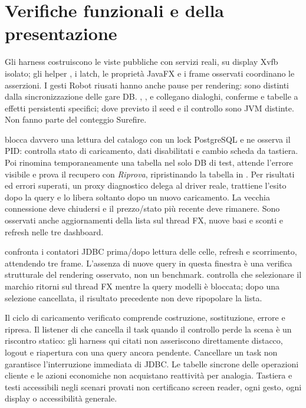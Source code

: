 \section{Verifiche funzionali e della presentazione}\label{sec:test-ui}
Gli harness costruiscono le viste pubbliche con servizi reali, su display
Xvfb isolato; gli helper , i latch, le proprietà JavaFX e i frame
osservati coordinano le asserzioni. I gesti Robot riusati hanno anche
pause per rendering: sono distinti dalla sincronizzazione delle gare DB.
, ,
 e  collegano dialoghi,
conferme e tabelle a effetti persistenti specifici; dove previsto il seed
e il controllo sono JVM distinte. Non fanno parte del conteggio Surefire.

 blocca davvero una lettura del catalogo
con un lock PostgreSQL e ne osserva il PID: controlla stato di caricamento,
dati disabilitati e cambio scheda da tastiera. Poi rinomina temporaneamente
una tabella nel solo DB di test, attende l'errore visibile e prova il
recupero con \emph{Riprova}, ripristinando la tabella in .
Per risultati ed errori superati, un proxy diagnostico delega al driver
reale, trattiene l'esito dopo la query e lo libera soltanto dopo un nuovo
caricamento. La vecchia connessione deve chiudersi e il prezzo/stato più
recente deve rimanere. Sono osservati anche aggiornamenti della lista sul
thread FX, nuove basi e sconti e refresh nelle tre dashboard.

 confronta i contatori JDBC prima/dopo
lettura delle celle, refresh e scorrimento, attendendo tre frame.
L'assenza di nuove query in questa finestra è una verifica strutturale
del rendering osservato, non un benchmark. 
controlla che selezionare il marchio ritorni sul thread FX mentre la
query modelli è bloccata; dopo una selezione cancellata, il risultato
precedente non deve ripopolare la lista.

Il ciclo di caricamento verificato comprende costruzione, sostituzione,
errore e ripresa. Il listener di  che cancella il task
quando il controllo perde la scena è un riscontro statico: gli harness
qui citati non asseriscono direttamente distacco, logout e riapertura
con una query ancora pendente. Cancellare un task non garantisce
l'interruzione immediata di JDBC. Le tabelle sincrone delle operazioni
cliente e le azioni economiche non acquistano reattività per analogia.
Tastiera e testi accessibili negli scenari provati non certificano screen
reader, ogni gesto, ogni display o accessibilità generale.

